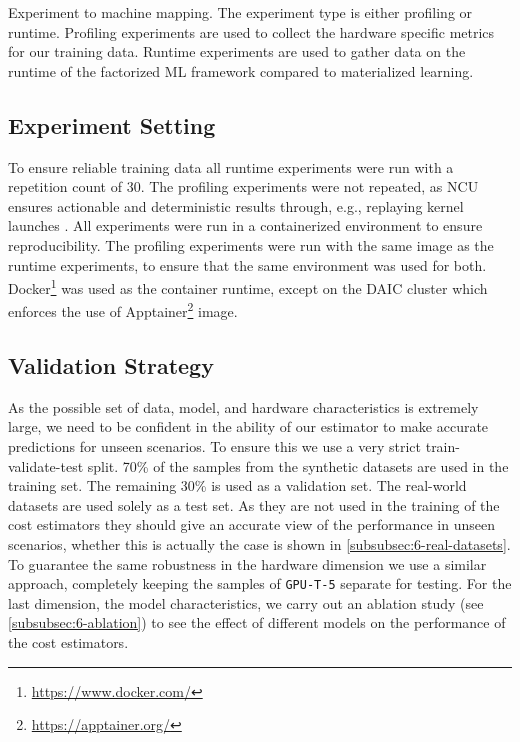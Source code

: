 \begin{table}[ht]
  \centering
  
  \caption[Experiment to machine mapping]{Experiment to machine mapping. The experiment type is either profiling or runtime. Profiling experiments are used to collect the hardware specific metrics for our training data. Runtime experiments are used to gather data on the runtime of the factorized ML framework compared to materialized learning.}
  \label{tab:6-hardware-overview}
\end{table}

\subsection{Experiment Setting}
To ensure reliable training data all runtime experiments were run with a repetition count of $30$. The profiling experiments were not repeated, as NCU ensures actionable and deterministic results through, e.g., replaying kernel launches \cite{nsight_compute}. All experiments were run in a containerized environment to ensure reproducibility. The profiling experiments were run with the same image as the runtime experiments, to ensure that the same environment was used for both. Docker\footnote{\url{https://www.docker.com/}} was used as the container runtime, except on the DAIC cluster which enforces the use of Apptainer\footnote{\url{https://apptainer.org/}} image.

\subsection{Validation Strategy}
\label{subsec:6-validation-strategy}

As the possible set of data, model, and hardware characteristics is extremely large, we need to be confident in the ability of our estimator to make accurate predictions for unseen scenarios. To ensure this we use a very strict train-validate-test split. 70\% of the samples from the synthetic datasets are used in the training set. The remaining 30\% is used as a validation set. The real-world datasets are used solely as a test set. As they are not used in the training of the cost estimators they should give an accurate view of the performance in unseen scenarios, whether this is actually the case is shown in \autoref{subsubsec:6-real-datasets}. To guarantee the same robustness in the hardware dimension we use a similar approach, completely keeping the samples of \texttt{GPU-T-5} separate for testing. For the last dimension, the model characteristics, we carry out an ablation study (see \autoref{subsubsec:6-ablation}) to see the effect of different models on the performance of the cost estimators.


